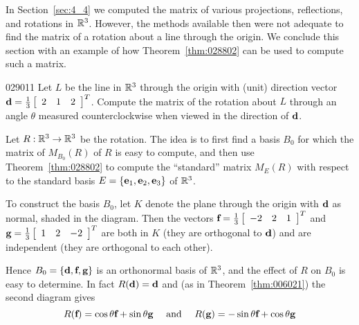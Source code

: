In Section~\ref{sec:4_4} we computed the matrix of various projections, reflections, and rotations in $\mathbb{R}^3$. However, the methods available then were not adequate to find the matrix of a rotation about a line through the origin. We conclude this section with an example of how Theorem~\ref{thm:028802} can be used to compute such a matrix.


\begin{example}{}{029011}
Let $L$ be the line in $\mathbb{R}^3$ through the origin with (unit) direction vector $\textbf{d} = \tfrac{1}{3}\left[ \begin{array}{ccc} 2 & 1 & 2 \end{array} \right]^T$. Compute the matrix of the rotation about $L$ through an angle $\theta$ measured counterclockwise when viewed in the direction of $\textbf{d}$.

\newpage
\begin{wrapfigure}[14]{l}{5cm}
	\centering
	
\end{wrapfigure}

\setlength{\rightskip}{0pt plus 200pt}
\begin{solution}
  Let $R : \mathbb{R}^3 \to \mathbb{R}^3$ be the rotation. The idea is to first find a basis $B_{0}$ for which the matrix of $M_{B_0}(R)$ of $R$ is easy to compute, and then use Theorem~\ref{thm:028802} to compute the ``standard'' matrix $M_{E}(R)$ with respect to the standard basis $E = \{\textbf{e}_{1}, \textbf{e}_{2}, \textbf{e}_{3}\}$ of $\mathbb{R}^3$.


To construct the basis $B_{0}$, let $K$ denote the plane through the origin with $\textbf{d}$ as normal, shaded in the diagram. Then the vectors $\textbf{f} = \tfrac{1}{3}\left[ \begin{array}{ccc} -2 & 2 & 1 \end{array} \right]^T$ and $\textbf{g} = \tfrac{1}{3}\left[ \begin{array}{ccc} 1 & 2 & -2 \end{array} \right]^T$ are both in $K$ (they are orthogonal to $\textbf{d}$) and are independent (they are orthogonal to each other).

Hence $B_{0} = \{\textbf{d}, \textbf{f}, \textbf{g}\}$ is an orthonormal basis of $\mathbb{R}^3$, and the effect of $R$ on $B_{0}$ is easy to determine. In fact $R(\textbf{d}) = \textbf{d}$ and (as in Theorem~\ref{thm:006021}) the second diagram gives
\begin{equation*}
R(\textbf{f}) = \cos \theta \textbf{f} + \sin \theta \textbf{g} \quad \mbox{ and } \quad R(\textbf{g}) = -\sin \theta \textbf{f} + \cos \theta \textbf{g}
\end{equation*}


\end{solution}
\end{example}
